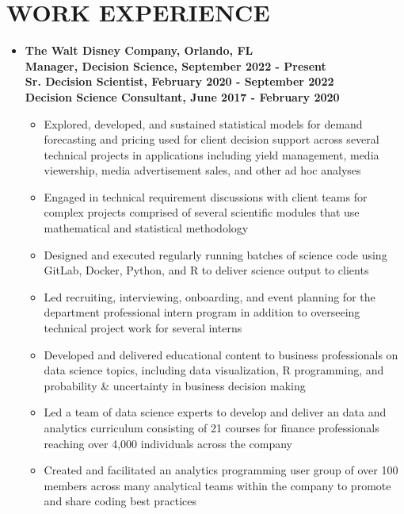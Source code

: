\documentclass[10pt]{article}
\begin{document}
\section*{WORK EXPERIENCE}
\begin{itemize}
\item[] \textbf{The Walt Disney Company, Orlando, FL\\
Manager, Decision Science, September 2022 - Present \\
Sr. Decision Scientist, February 2020 - September 2022 \\
Decision Science Consultant, June 2017 - February 2020}
\begin{itemize}
\item Explored, developed, and sustained statistical models for demand forecasting and pricing used for client decision support across several technical projects in applications including yield management, media viewership, media advertisement sales, and other ad hoc analyses 
\item Engaged in technical requirement discussions with client teams for complex projects comprised of several scientific modules that use mathematical and statistical methodology
\item Designed and executed regularly running batches of science code using GitLab, Docker, Python, and R to deliver science output to clients
\item Led recruiting, interviewing, onboarding, and event planning for the department professional intern program in addition to overseeing technical project work for several interns
\item Developed and delivered educational content to business professionals on data science topics, including data visualization, R programming, and probability \& uncertainty in business decision making
\item Led a team of data science experts to develop and deliver an data and analytics curriculum consisting of 21 courses for finance professionals reaching over 4,000 individuals across the company
\item Created and facilitated an analytics programming user group of over 100 members across many analytical teams within the company to promote and share coding best practices
\end{itemize}


\end{itemize}
\end{document}
